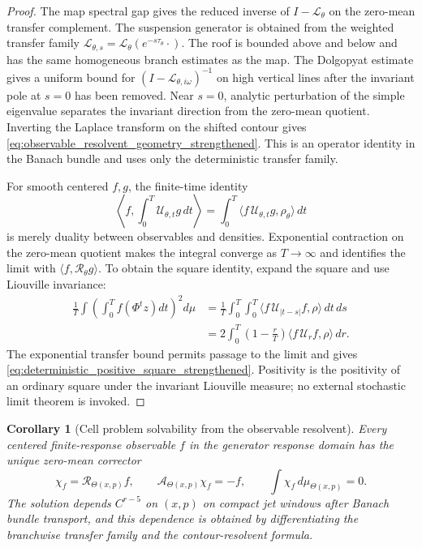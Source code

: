 \documentclass[12pt, letterpaper]{amsart}
\newcommand{\Acal}{\mathcal{A}}
\newcommand{\Rcal}{\mathcal{R}}
\providecommand{\Ltransfer}{\mathscr{L}}
\theoremstyle{plain}
\newtheorem{corollary}[theorem]{Corollary}
\theoremstyle{definition}
\theoremstyle{remark}
\begin{document}
\begin{proof}
The map spectral gap gives the reduced inverse of $I-\Ltransfer_\theta$ on the
zero-mean transfer complement.  The suspension generator is obtained from the
weighted transfer family
$\Ltransfer_{\theta,s}=\Ltransfer_\theta(e^{-s\tau_\theta}\cdot)$.  The roof is
bounded above and below and has the same homogeneous branch estimates as the
map.  The Dolgopyat estimate gives a uniform bound for
$(I-\Ltransfer_{\theta,i\omega})^{-1}$ on high vertical lines after the
invariant pole at $s=0$ has been removed.  Near $s=0$, analytic perturbation of
the simple eigenvalue separates the invariant direction from the zero-mean
quotient.  Inverting the Laplace transform on the shifted contour gives
\eqref{eq:observable_resolvent_geometry_strengthened}.  This is an operator
identity in the Banach bundle and uses only the deterministic transfer family.

For smooth centered $f,g$, the finite-time identity
\begin{equation}
    \left\langle f,\int_0^T \mathscr U_{\theta,t}g\,dt\right\rangle
    =\int_0^T \langle f\,\mathscr U_{\theta,t}g,\rho_\theta\rangle\,dt
\end{equation}
is merely duality between observables and densities.  Exponential contraction
on the zero-mean quotient makes the integral converge as $T\to\infty$ and
identifies the limit with $\langle f,\Rcal_\theta g\rangle$.  To obtain the
square identity, expand the square and use Liouville invariance:
\begin{equation}
\begin{split}
\frac{1}{T}\int\left(\int_0^T f(\Phi^t z)dt\right)^2d\mu
&=\frac{1}{T}\int_0^T\int_0^T
   \langle f\,\mathscr U_{|t-s|}f,\rho\rangle\,dt\,ds \\
&=2\int_0^T \left(1-\frac{r}{T}\right)
   \langle f\,\mathscr U_r f,\rho\rangle\,dr.
\end{split}
\end{equation}
The exponential transfer bound permits passage to the limit and gives
\eqref{eq:deterministic_positive_square_strengthened}.  Positivity is the
positivity of an ordinary square under the invariant Liouville measure; no
external stochastic limit theorem is invoked.
\end{proof}

\begin{corollary}[Cell problem solvability from the observable resolvent]
\label{cor:cell_problem_from_observable_resolvent_strengthened}
Every centered finite-response observable $f$ in the generator response domain
has the unique zero-mean corrector
\begin{equation}
    \chi_f=\Rcal_{\Theta(x,p)}f,
    \qquad
    \Acal_{\Theta(x,p)}\chi_f=-f,
    \qquad
    \int\chi_f\,d\mu_{\Theta(x,p)}=0.
\end{equation}
The solution depends $C^{r-5}$ on $(x,p)$ on compact jet windows after Banach
bundle transport, and this dependence is obtained by differentiating the
branchwise transfer family and the contour-resolvent formula.
\end{corollary}
\end{document}

